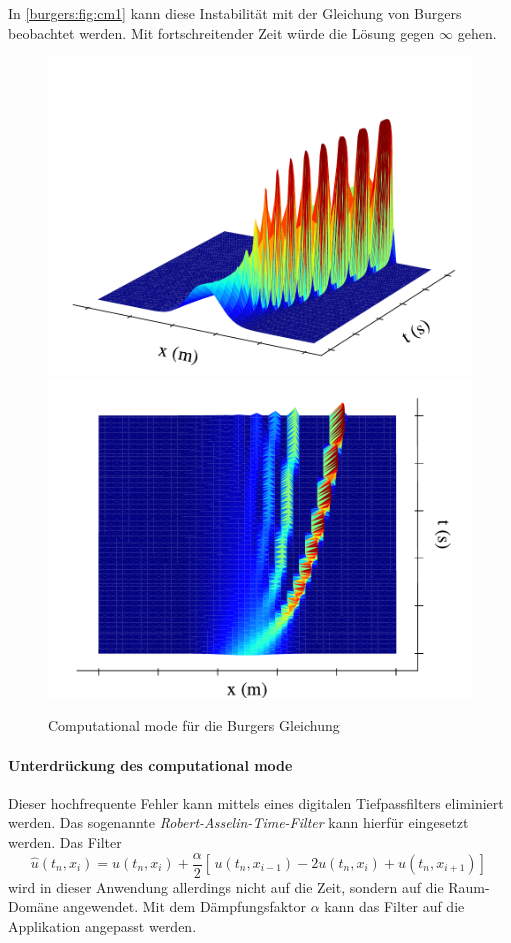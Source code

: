 	In \autoref{burgers:fig:cm1} kann diese Instabilit\"at mit der Gleichung von Burgers beobachtet werden.
	Mit fortschreitender Zeit w\"urde die L\"osung gegen $\infty$ gehen.


  \begin{figure}
	\centering
	\includegraphics[width=.49\textwidth]{papers/burgers/BurgersEquation/images/Leap_Frog_front.pdf}
	\includegraphics[width=.49\textwidth]{papers/burgers/BurgersEquation/images/Leap_Frog_top.pdf}
	\caption{Computational mode für die Burgers Gleichung}
	\label{burgers:fig:cm1}
	\end{figure}

	\paragraph{Unterdrückung des computational mode}
	\label{burgers:sec:cm}

	Dieser hochfrequente Fehler kann mittels eines digitalen Tiefpassfilters eliminiert werden.
%
	Das sogenannte {\em Robert-Asselin-Time-Filter} \cite{burgers:time_filter} kann hierf\"ur eingesetzt werden.
%
	Das Filter
		\begin{equation}
			\hat{u}(t_n,x_i) = u(t_n,x_i)+ \frac{\alpha}{2} [ \, u(t_n,x_{i-1}) - 2u(t_n,x_i)+u(t_n,x_{i+1}) ] \,
		\end{equation}
	wird in dieser Anwendung allerdings nicht auf die Zeit, sondern auf die Raum-Dom\"ane angewendet.
	Mit dem D\"ampfungsfaktor $\alpha$ kann das Filter auf die Applikation angepasst werden.

